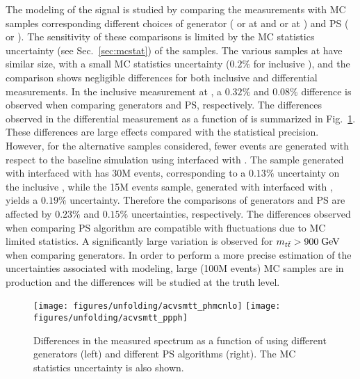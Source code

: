 The modeling of the \ttbar{} signal is studied by comparing the
measurements with MC samples corresponding different choices of generator
(\alpgen{} or \mcatnlo{} at \seventev{} and \powheg{} or \mcatnlo{} at
\eighttev{}) and PS (\pythia{} or \herwig{}).
The sensitivity of these comparisons is limited by the MC statistics
uncertainty (see Sec.~\ref{sec:mcstat}) of the samples. 
The various \ttbar{} samples  at \seventev{} have similar size, with a
small MC statistics uncertainty ($0.2\%$ for inclusive
\ac{}), and the comparison shows negligible differences for both
inclusive and differential measurements. 
In the inclusive measurement at \eighttev{}, a $0.32\%$ and $0.08\%$
difference is observed when comparing generators and PS,
respectively. The differences observed in the differential measurement
as a function of \mtt{} is summarized in Fig.~\ref{fig:ttbarmodel}.
These differences are large effects compared with the statistical
precision. However, for the alternative \ttbar{} samples considered,
fewer events are generated with respect to the baseline simulation
using \powheg{} interfaced with \pythia{}. 
The sample generated with \powheg{} interfaced with \pythia{} has 30M
events, corresponding to a $0.13\%$ uncertainty on the inclusive
\ac{}, while the 15M events sample, generated with \mcatnlo{}
interfaced with \herwig{}, yields a $0.19\%$ uncertainty. Therefore
the comparisons of generators and PS are affected by $0.23\%$ and
$0.15\%$ uncertainties, respectively. The differences observed when
comparing PS algorithm are compatible with fluctuations due to MC limited
statistics. A significantly large variation is observed for
$m_{t\bar{t}}{}>900\; \mathrm{GeV}{}$ when comparing generators.
In order to perform a more precise estimation of the uncertainties
associated with \ttbar{} modeling, large (100M events) MC samples are
in production and the differences will be studied at the truth level.

\begin{figure}[!htb]\centering
  \texttt{[image: figures/unfolding/acvsmtt\_phmcnlo]}
  \texttt{[image: figures/unfolding/acvsmtt\_ppph]}
  \caption{Differences in the measured \ac{} spectrum as a function of
    \mtt{} using different generators (left) and different PS
    algorithms (right). The MC statistics uncertainty is also
    shown.}
  \label{fig:ttbarmodel}
\end{figure}
